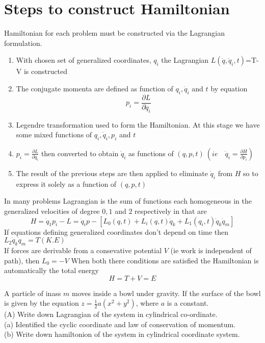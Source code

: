 \section{Steps to construct Hamiltonian}
Hamiltonian for each problem must be constructed via the Lagrangian formulation.
\begin{enumerate}
	\item With chosen set of generalized coordinates, $q_i$ the Lagrangian $L(\dot{q},\dot{q}_i,t)$=T-V is constructed
	\item The conjugate momenta are defined as function of $q_i,\dot{q}_i$ and $t$ by equation
	$$p_i=\frac{\partial L}{\partial \dot{q}_i}$$
	\item Legendre transformation used to form the Hamiltonian. At this stage we have some mixed functions of $q_i,\dot{q}_i,p_i$ and $t$
	\item $p_i=\frac{\partial L}{\partial \dot{q}_i}$ then converted to obtain $\dot{q}_i$ as functions of $(q,p,t)\ (ie\quad \dot{q}_i=\frac{\partial H}{\partial p_i})$
	\item The result of the previous steps are then applied to eliminate $\dot{q}_i$ from $H$ so to express it solely as a function of $(q,p,t)$
\end{enumerate}
\begin{note}
	In many problems Lagrangian is the sum of functions each homogeneous in the generalized velocities of degree $0,1$ and $2$ respectively in that are
	$$ H=\dot{q}_1p_i-L=\dot{q}_ip-[L_0(q,t)+L_i(q,t)\dot{q}_k+L_1(q_i,t)\dot{q}_k\dot{q}_m]$$
	If equations defining generalized coordinates don't depend on time then $L_2 \dot{q}_k\dot{q}_m=T(K.E)$\\
	If forces are derivable from a consevative potential $V$ (ie work is independent of path), then $L_0=-V$
	When both there conditions are satisfied the Hamiltonian is automatically the total energy
	$$H=T+V=
	E$$
\end{note}
\begin{exercise}
	A particle of inass $m$ moves inside a bowl under gravity. If the surface of the bowl is given by the equation $z=\frac{1}{2} a\left(x^{2}+y^{2}\right)$, where $a$ is a constant.\\
	(A) Write down Lagrangian of the system in cylindrical co-ordinate.\\
	(a) Identified the cyclic coordinate and law of conservation of momentum.\\
	(b) Write down hamiltonion of the system in cylindrical coordinate system.
\end{exercise}
